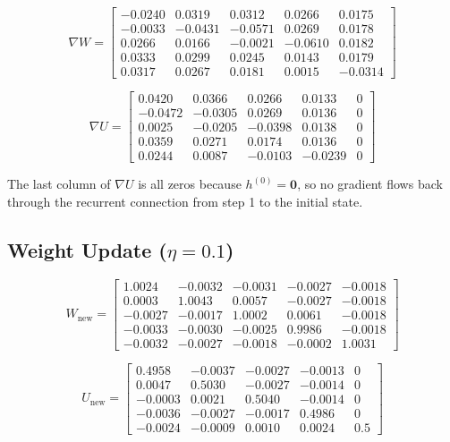 \begin{equation}
    \nabla W = \begin{bmatrix}
    -0.0240 &  0.0319 &  0.0312 &  0.0266 &  0.0175 \\
    -0.0033 & -0.0431 & -0.0571 &  0.0269 &  0.0178 \\
     0.0266 &  0.0166 & -0.0021 & -0.0610 &  0.0182 \\
     0.0333 &  0.0299 &  0.0245 &  0.0143 &  0.0179 \\
     0.0317 &  0.0267 &  0.0181 &  0.0015 & -0.0314
    \end{bmatrix}
\end{equation}

\begin{equation}
    \nabla U = \begin{bmatrix}
     0.0420 &  0.0366 &  0.0266 &  0.0133 &  0 \\
    -0.0472 & -0.0305 &  0.0269 &  0.0136 &  0 \\
     0.0025 & -0.0205 & -0.0398 &  0.0138 &  0 \\
     0.0359 &  0.0271 &  0.0174 &  0.0136 &  0 \\
     0.0244 &  0.0087 & -0.0103 & -0.0239 &  0
    \end{bmatrix}
\end{equation}

The last column of $\nabla U$ is all zeros because $h^{(0)} = \mathbf{0}$, so no gradient
flows back through the recurrent connection from step 1 to the initial state.

\subsection{Weight Update ($\eta = 0.1$)}

\begin{equation}
    W_{\text{new}} = \begin{bmatrix}
     1.0024 & -0.0032 & -0.0031 & -0.0027 & -0.0018 \\
     0.0003 &  1.0043 &  0.0057 & -0.0027 & -0.0018 \\
    -0.0027 & -0.0017 &  1.0002 &  0.0061 & -0.0018 \\
    -0.0033 & -0.0030 & -0.0025 &  0.9986 & -0.0018 \\
    -0.0032 & -0.0027 & -0.0018 & -0.0002 &  1.0031
    \end{bmatrix}
\end{equation}

\begin{equation}
    U_{\text{new}} = \begin{bmatrix}
     0.4958 & -0.0037 & -0.0027 & -0.0013 &  0 \\
     0.0047 &  0.5030 & -0.0027 & -0.0014 &  0 \\
    -0.0003 &  0.0021 &  0.5040 & -0.0014 &  0 \\
    -0.0036 & -0.0027 & -0.0017 &  0.4986 &  0 \\
    -0.0024 & -0.0009 &  0.0010 &  0.0024 &  0.5
    \end{bmatrix}
\end{equation}


